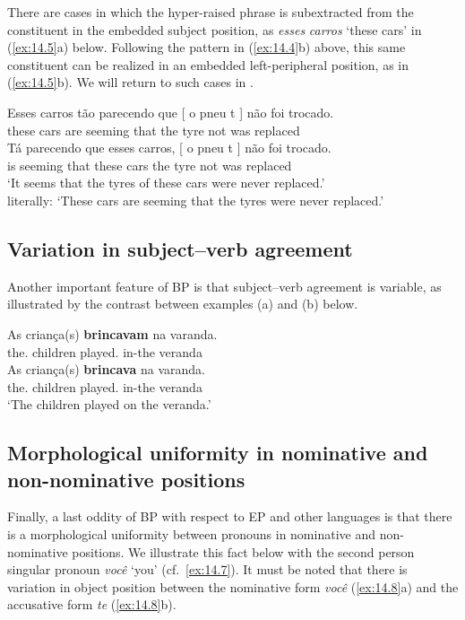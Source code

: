 \documentclass[output=paper]{langsci/langscibook}
\begin{document}
There are cases in which the hyper-raised phrase is subextracted from the
constituent in the embedded subject position, as \emph{esses} \emph{carros}
‘these cars’ in (\ref{ex:14.5}a) below. Following the pattern in (\ref{ex:14.4}b)
above, this same constituent can be realized in an embedded left-peripheral
position, as in (\ref{ex:14.5}b). We will return to such cases in
.

\ea\label{ex:14.5}
    \ea
	\gll    Esses carros tão parecendo que [ o pneu t ] não foi trocado.\\
            these cars are seeming that {} the tyre {} {} not was replaced\\
    \ex
    \gll    Tá parecendo que esses carros, [ o pneu t ] não foi trocado.\\
            is seeming that these cars {} the tyre {} {} not was replaced\\
    \glt    ‘It seems that the tyres of these cars were never replaced.’\\
            literally: ‘These cars are seeming that the tyres were never replaced.’
    \z
\z

\subsection{Variation in subject--verb agreement}\label{sec:14.2.4}

Another important feature of \gls{BP} is that subject--verb agreement is
variable, as illustrated by the contrast between examples (a) and (b) below.

\ea%
    \label{ex:14.6}
	\ea
	\gll    As criança(s) \textbf{brincavam} na varanda.\\
            the.\Pl{}  children played.\Tpl{} in-the veranda\\
    \ex
    \gll    As criança(s) \textbf{brincava} na varanda.\\
            the.\Pl{}  children played.\Tsg{} in-the veranda\\
    \glt    ‘The children played on the veranda.’
    \z
\z

\subsection{Morphological uniformity in nominative and non-nominative positions}

Finally, a last oddity of \gls{BP} with respect to \gls{EP} and other 
languages is that there is a morphological uniformity between pronouns in
nominative and non-nominative positions. We illustrate this fact below with the
second person singular pronoun \emph{você} ‘you’ (cf.\ \ref{ex:14.7}). It
must be noted that there is variation in object position between the
nominative form \emph{você} (\ref{ex:14.8}a) and the accusative form
\emph{te} (\ref{ex:14.8}b).
\end{document}
